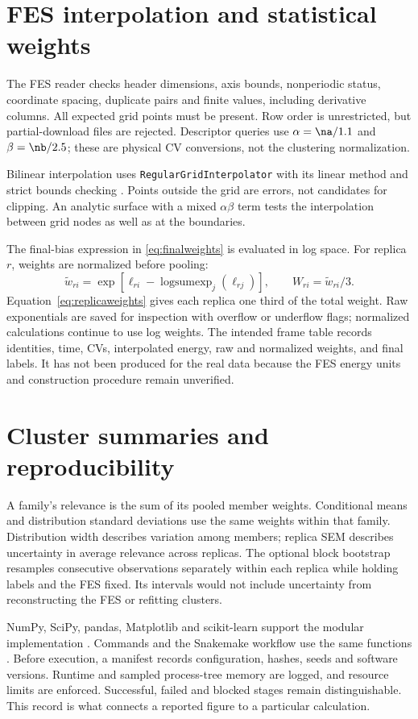 \section{FES interpolation and statistical weights}
The FES reader checks header dimensions, axis bounds, nonperiodic status, coordinate spacing, duplicate pairs and finite values, including derivative columns. All expected grid points must be present. Row order is unrestricted, but partial-download files are rejected. Descriptor queries use $\alpha=\na/1.1$ and $\beta=\nb/2.5$; these are physical CV conversions, not the clustering normalization.

Bilinear interpolation uses \texttt{RegularGridInterpolator} with its linear method and strict bounds checking \autocite{scipygrid,virtanen2020}. Points outside the grid are errors, not candidates for clipping. An analytic surface with a mixed $\alpha\beta$ term tests the interpolation between grid nodes as well as at the boundaries.

The final-bias expression in \cref{eq:finalweights} is evaluated in log space. For replica $r$, weights are normalized before pooling:
\begin{equation}
\widetilde w_{ri}=\exp\!\left[\ell_{ri}-\operatorname{logsumexp}_j(\ell_{rj})\right],
\qquad W_{ri}=\widetilde w_{ri}/3.
\label{eq:replicaweights}
\end{equation}
Equation~\ref{eq:replicaweights} gives each replica one third of the total weight. Raw exponentials are saved for inspection with overflow or underflow flags; normalized calculations continue to use log weights. The intended frame table records identities, time, CVs, interpolated energy, raw and normalized weights, and final labels. It has not been produced for the real data because the FES energy units and construction procedure remain unverified.

\section{Cluster summaries and reproducibility}
A family's relevance is the sum of its pooled member weights. Conditional means and distribution standard deviations use the same weights within that family. Distribution width describes variation among members; replica SEM describes uncertainty in average relevance across replicas. The optional block bootstrap resamples consecutive observations separately within each replica while holding labels and the FES fixed. Its intervals would not include uncertainty from reconstructing the FES or refitting clusters.

NumPy, SciPy, pandas, Matplotlib and scikit-learn support the modular implementation \autocite{harris2020,virtanen2020,pedregosa2011}. Commands and the Snakemake workflow use the same functions \autocite{snakemakedocs,wratten2021}. Before execution, a manifest records configuration, hashes, seeds and software versions. Runtime and sampled process-tree memory are logged, and resource limits are enforced. Successful, failed and blocked stages remain distinguishable. This record is what connects a reported figure to a particular calculation.

